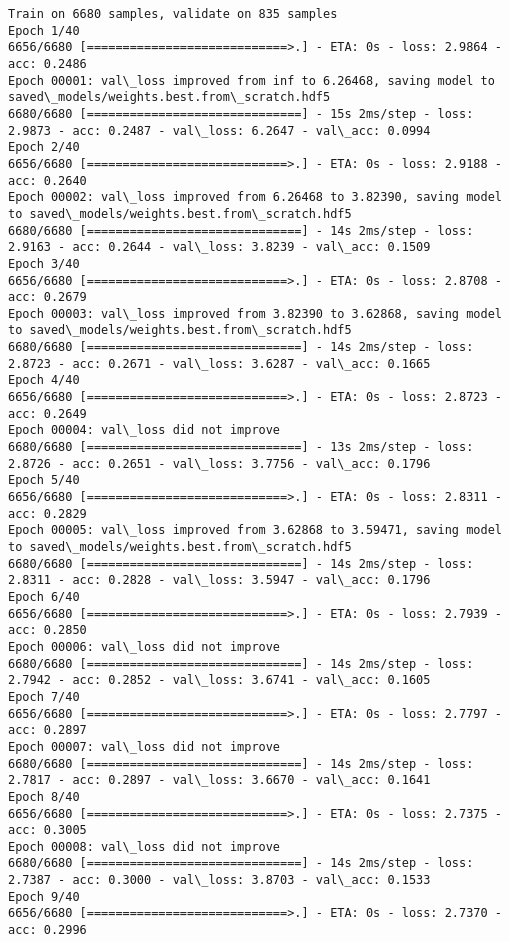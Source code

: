 \documentclass[11pt]{article}
\begin{document}
    \begin{Verbatim}[commandchars=\\\{\}]
Train on 6680 samples, validate on 835 samples
Epoch 1/40
6656/6680 [============================>.] - ETA: 0s - loss: 2.9864 - acc: 0.2486
Epoch 00001: val\_loss improved from inf to 6.26468, saving model to saved\_models/weights.best.from\_scratch.hdf5
6680/6680 [==============================] - 15s 2ms/step - loss: 2.9873 - acc: 0.2487 - val\_loss: 6.2647 - val\_acc: 0.0994
Epoch 2/40
6656/6680 [============================>.] - ETA: 0s - loss: 2.9188 - acc: 0.2640
Epoch 00002: val\_loss improved from 6.26468 to 3.82390, saving model to saved\_models/weights.best.from\_scratch.hdf5
6680/6680 [==============================] - 14s 2ms/step - loss: 2.9163 - acc: 0.2644 - val\_loss: 3.8239 - val\_acc: 0.1509
Epoch 3/40
6656/6680 [============================>.] - ETA: 0s - loss: 2.8708 - acc: 0.2679
Epoch 00003: val\_loss improved from 3.82390 to 3.62868, saving model to saved\_models/weights.best.from\_scratch.hdf5
6680/6680 [==============================] - 14s 2ms/step - loss: 2.8723 - acc: 0.2671 - val\_loss: 3.6287 - val\_acc: 0.1665
Epoch 4/40
6656/6680 [============================>.] - ETA: 0s - loss: 2.8723 - acc: 0.2649
Epoch 00004: val\_loss did not improve
6680/6680 [==============================] - 13s 2ms/step - loss: 2.8726 - acc: 0.2651 - val\_loss: 3.7756 - val\_acc: 0.1796
Epoch 5/40
6656/6680 [============================>.] - ETA: 0s - loss: 2.8311 - acc: 0.2829
Epoch 00005: val\_loss improved from 3.62868 to 3.59471, saving model to saved\_models/weights.best.from\_scratch.hdf5
6680/6680 [==============================] - 14s 2ms/step - loss: 2.8311 - acc: 0.2828 - val\_loss: 3.5947 - val\_acc: 0.1796
Epoch 6/40
6656/6680 [============================>.] - ETA: 0s - loss: 2.7939 - acc: 0.2850
Epoch 00006: val\_loss did not improve
6680/6680 [==============================] - 14s 2ms/step - loss: 2.7942 - acc: 0.2852 - val\_loss: 3.6741 - val\_acc: 0.1605
Epoch 7/40
6656/6680 [============================>.] - ETA: 0s - loss: 2.7797 - acc: 0.2897
Epoch 00007: val\_loss did not improve
6680/6680 [==============================] - 14s 2ms/step - loss: 2.7817 - acc: 0.2897 - val\_loss: 3.6670 - val\_acc: 0.1641
Epoch 8/40
6656/6680 [============================>.] - ETA: 0s - loss: 2.7375 - acc: 0.3005
Epoch 00008: val\_loss did not improve
6680/6680 [==============================] - 14s 2ms/step - loss: 2.7387 - acc: 0.3000 - val\_loss: 3.8703 - val\_acc: 0.1533
Epoch 9/40
6656/6680 [============================>.] - ETA: 0s - loss: 2.7370 - acc: 0.2996

\end{Verbatim}
\end{document}
